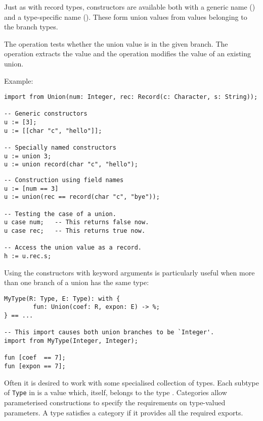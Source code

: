 Just as with record types, constructors
are available both with a generic name () 
and a type-specific name ().
These form union values from values belonging to the branch types.

The  operation tests whether the union value is in the given
branch. The  operation extracts the value and the 
operation modifies the value of an existing union.

Example:

\begin{small}
\begin{verbatim}
import from Union(num: Integer, rec: Record(c: Character, s: String));

-- Generic constructors
u := [3];
u := [[char "c", "hello"]];

-- Specially named constructors
u := union 3;
u := union record(char "c", "hello");
\end{verbatim}
\end{small}

\begin{small}
\begin{verbatim}
-- Construction using field names
u := [num == 3]
u := union(rec == record(char "c", "bye"));

-- Testing the case of a union.
u case num;   -- This returns false now.
u case rec;   -- This returns true now.

-- Access the union value as a record.
h := u.rec.s;
\end{verbatim}
\end{small}

Using the constructors with keyword arguments is particularly
useful when more than one branch of a union has the same type:

\begin{small}
\begin{verbatim}
MyType(R: Type, E: Type): with {
        fun: Union(coef: R, expon: E) -> %;
} == ...

-- This import causes both union branches to be `Integer'.
import from MyType(Integer, Integer);

fun [coef  == 7];
fun [expon == 7];
\end{verbatim}
\end{small}


%
%
Often it is desired to work with some specialised collection of types.
Each subtype of \verb"Type" in \asharp{} is a value which, itself,
belongs to the type .
Categories allow parameterised constructions to specify the
requirements on type-valued parameters.  
A type satisfies a category if it provides all the required exports.

